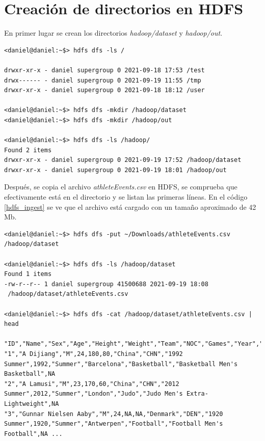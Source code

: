\section*{Creación de directorios en HDFS}
En primer lugar se crean los directorios \textit{hadoop/dataset} y \textit{hadoop/out}.
\begin{lstlisting}[style=base,caption={Creación de los directorios de trabajo}, label={hdfs_creation}]
<daniel@daniel:~$> hdfs dfs -ls /

drwxr-xr-x - daniel supergroup 0 2021-09-18 17:53 /test
drwx------ - daniel supergroup 0 2021-09-19 11:55 /tmp
drwxr-xr-x - daniel supergroup 0 2021-09-18 18:12 /user

<daniel@daniel:~$> hdfs dfs -mkdir /hadoop/dataset
<daniel@daniel:~$> hdfs dfs -mkdir /hadoop/out

<daniel@daniel:~$> hdfs dfs -ls /hadoop/
Found 2 items
drwxr-xr-x - daniel supergroup 0 2021-09-19 17:52 /hadoop/dataset
drwxr-xr-x - daniel supergroup 0 2021-09-19 18:01 /hadoop/out
\end{lstlisting}
Después, se copia el archivo \textit{athleteEvents.csv} en HDFS, se comprueba que efectivamente está en el directorio y se listan las primeras líneas.  En el código \ref{hdfs_ingest} se ve que el archivo está cargado con un tamaño aproximado de 42 Mb.
\begin{lstlisting}[style=base,caption={Ingesta de datos}, label={hdfs_ingest}]
<daniel@daniel:~$> hdfs dfs -put ~/Downloads/athleteEvents.csv 
/hadoop/dataset

<daniel@daniel:~$> hdfs dfs -ls /hadoop/dataset
Found 1 items
-rw-r--r-- 1 daniel supergroup 41500688 2021-09-19 18:08
 /hadoop/dataset/athleteEvents.csv
 
<daniel@daniel:~$> hdfs dfs -cat /hadoop/dataset/athleteEvents.csv | head

"ID","Name","Sex","Age","Height","Weight","Team","NOC","Games","Year","Season","City","Sport","Event","Medal"
"1","A Dijiang","M",24,180,80,"China","CHN","1992 Summer",1992,"Summer","Barcelona","Basketball","Basketball Men's Basketball",NA
"2","A Lamusi","M",23,170,60,"China","CHN","2012 Summer",2012,"Summer","London","Judo","Judo Men's Extra-Lightweight",NA
"3","Gunnar Nielsen Aaby","M",24,NA,NA,"Denmark","DEN","1920 Summer",1920,"Summer","Antwerpen","Football","Football Men's Football",NA ...
\end{lstlisting}
